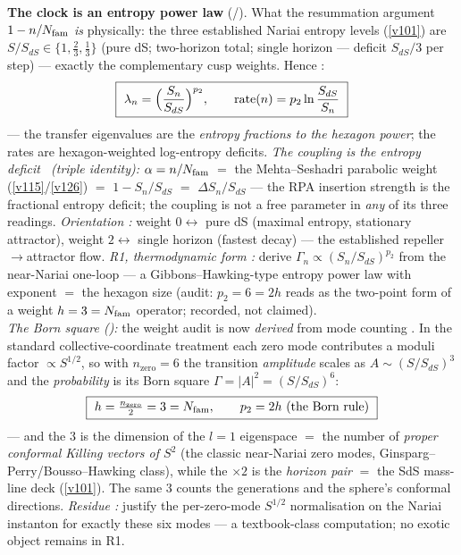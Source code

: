\par\smallskip\noindent\textbf{The clock is an entropy power law} (\mE/\mC).
What the resummation argument $1-n/N_{\mathrm{fam}}$ \emph{is} physically: the three established Nariai entropy
levels (\vref{v101}) are $S/S_{dS}\in\{1,\tfrac23,\tfrac13\}$ (pure dS; two-horizon total; single horizon ---
deficit $S_{dS}/3$ per step) --- exactly the complementary cusp weights. Hence \mE:
\[
  \boxed{\ \lambda_n=\Bigl(\frac{S_n}{S_{dS}}\Bigr)^{p_2},\qquad
  \mathrm{rate}(n)=p_2\ln\frac{S_{dS}}{S_n}\ }
\]
--- the transfer eigenvalues are the \emph{entropy fractions to the hexagon power}; the rates are
hexagon-weighted log-entropy deficits. \emph{The coupling is the entropy deficit \mE\ (triple
identity):} $\alpha=n/N_{\mathrm{fam}}$ $=$ the Mehta--Seshadri parabolic weight (\vref{v115}/\vref{v126}) $=$
$1-S_n/S_{dS}$ $=$ $\Delta S_n/S_{dS}$ --- the RPA insertion strength is the fractional entropy
deficit; the coupling is not a free parameter in \emph{any} of its three readings. \emph{Orientation
\mE:} weight $0\leftrightarrow$ pure dS (maximal entropy, stationary attractor), weight
$2\leftrightarrow$ single horizon (fastest decay) --- the established repeller$\to$attractor flow.
\emph{R1, thermodynamic form \mC:} derive $\Gamma_n\propto(S_n/S_{dS})^{p_2}$ from the near-Nariai
one-loop --- a Gibbons--Hawking-type entropy power law with exponent $=$ the hexagon size (audit:
$p_2=6=2h$ reads as the two-point form of a weight $h=3=N_{\mathrm{fam}}$ operator; recorded, not claimed).
\smallskip\\
\noindent\emph{The Born square ():} the weight audit is now \emph{derived}
from mode counting \mE. In the standard collective-coordinate treatment each zero mode contributes a
moduli factor $\propto S^{1/2}$, so with $n_{\mathrm{zero}}=6$ the transition \emph{amplitude} scales
as $A\sim(S/S_{dS})^{3}$ and the \emph{probability} is its Born square $\Gamma=|A|^2=(S/S_{dS})^{6}$:
\[
  \boxed{\ h=\tfrac{n_{\mathrm{zero}}}2=3=\Nfam,\qquad p_2=2h\ \text{(the Born rule)}\ }
\]
--- and the $3$ is the dimension of the $l{=}1$ eigenspace $=$ the number of \emph{proper conformal
Killing vectors of $S^2$} (the classic near-Nariai zero modes, Ginsparg--Perry/Bousso--Hawking class),
while the $\times2$ is the \emph{horizon pair} $=$ the SdS mass-line deck (\vref{v101}). The same $3$ counts
the generations and the sphere's conformal directions. \emph{Residue \mC:} justify the per-zero-mode
$S^{1/2}$ normalisation on the Nariai instanton for exactly these six modes --- a textbook-class
computation; no exotic object remains in R1.
